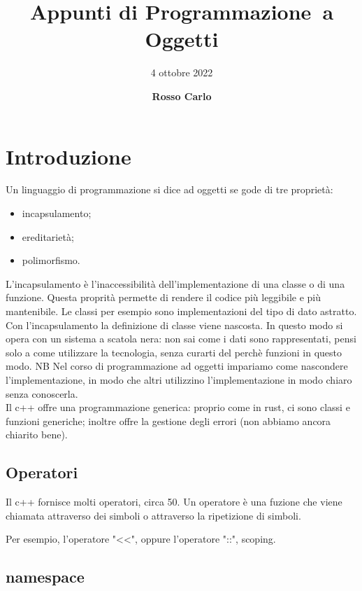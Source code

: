 \documentclass{article}
\title{\vspace{2cm}\textbf{Appunti di Programmazione\ a Oggetti}}
\author{\vspace{3mm}4 ottobre 2022}
\date{\vspace{3mm} \textbf{Rosso Carlo}}
\begin{document}
\begin{titlepage}
	\maketitle
	\thispagestyle{empty}
\end{titlepage}
\tableofcontents
\newpage

\section{Introduzione}

Un linguaggio di programmazione si dice ad oggetti se gode di tre proprietà:

\begin{itemize}
    \item incapsulamento;
    \item ereditarietà;
    \item polimorfismo.
\end{itemize}

L'incapsulamento è l'inaccessibilità dell'implementazione di una classe o di una
funzione. Questa proprità permette di rendere il codice più leggibile e più
mantenibile. Le classi per esempio sono implementazioni del tipo di dato
astratto. Con l'incapsulamento la definizione di classe viene nascosta. In
questo modo si opera con un sistema a scatola nera: non sai come i dati sono
rappresentati, pensi solo a come utilizzare la tecnologia, senza curarti del
perchè funzioni in questo modo. NB Nel corso di programmazione ad oggetti
impariamo come nascondere l'implementazione, in modo che altri utilizzino
l'implementazione in modo chiaro senza conoscerla.\\

Il c++ offre una programmazione generica: proprio come in rust, ci sono classi e
funzioni generiche; inoltre offre la gestione degli errori (non abbiamo ancora
chiarito bene).

\subsection{Operatori} 

Il c++ fornisce molti operatori, circa 50. Un operatore è una fuzione che viene
chiamata attraverso dei simboli o attraverso la ripetizione di simboli.

Per esempio, l'operatore "<<", oppure l'operatore "::", scoping.

\subsection{namespace}
\end{document}
